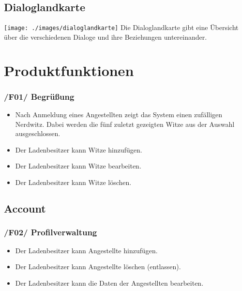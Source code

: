 \documentclass[pdftex,12pt,a4paper]{article}
\begin{document}
\subsection*{Dialoglandkarte}
\texttt{[image: ./images/dialoglandkarte]}
Die Dialoglandkarte gibt eine Übersicht über die verschiedenen Dialoge und ihre Beziehungen untereinander.
\newpage

\section{Produktfunktionen}
\subsubsection*{/F01/ Begr\"u\ss{}ung}
\begin{itemize}
\item Nach Anmeldung eines Angestellten zeigt das System einen zuf\"alligen Nerdwitz. Dabei werden die f\"unf zuletzt gezeigten Witze aus der Auswahl ausgeschlossen.
\item Der Ladenbesitzer kann Witze hinzuf\"ugen.
\item Der Ladenbesitzer kann Witze bearbeiten.
\item Der Ladenbesitzer kann Witze l\"oschen.
\end{itemize}
\subsection*{Account}
\subsubsection*{/F02/ Profilverwaltung}
\begin{itemize}
\item Der Ladenbesitzer kann Angestellte hinzufügen.
\item Der Ladenbesitzer kann Angestellte l\"oschen (entlassen).
\item Der Ladenbesitzer kann die Daten der Angestellten bearbeiten.
\end{itemize}
\end{document}
